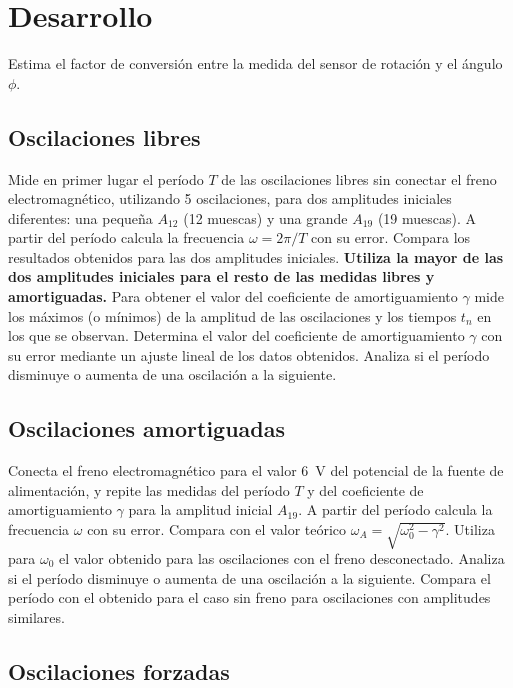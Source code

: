 \documentclass[11pt]{articulo}
\begin{document}
\section{Desarrollo}

Estima el factor de conversi\'on entre la medida del sensor de rotaci\'on y el \'angulo $\phi$.

\subsection{Oscilaciones libres}

Mide en primer lugar el per\'iodo $T$ de las oscilaciones libres sin conectar el freno electromagn\'etico, utilizando 5 oscilaciones, para dos amplitudes iniciales diferentes: una peque\~na $A_{12}$ (12 muescas) y una grande $A_{19}$ (19 muescas). A partir del per\'iodo calcula la frecuencia $\omega = 2\pi/T$ con su error. Compara los resultados obtenidos para las dos amplitudes iniciales. {\bf Utiliza la mayor de las dos amplitudes iniciales para el resto de las medidas libres y amortiguadas.} Para obtener el valor del coeficiente de amortiguamiento $\gamma$ mide los m\'aximos (o m\'inimos) de la amplitud de las oscilaciones y los tiempos $t_n$ en los que se observan. Determina el valor del coeficiente de amortiguamiento $\gamma$ con su error mediante un ajuste lineal de los datos obtenidos. Analiza si el per\'iodo disminuye o aumenta de una oscilaci\'on a la siguiente.

\subsection{Oscilaciones amortiguadas}

Conecta el freno electromagn\'etico para el valor 6~V del potencial de la fuente de alimentaci\'on, y repite las medidas del per\'iodo $T$ y del coeficiente de amortiguamiento $\gamma$ para la amplitud inicial $A_{19}$. A partir del per\'iodo calcula la frecuencia $\omega$ con su error. Compara con el valor te\'orico $\omega_A = \sqrt{\omega_0^2 - \gamma^2}$. Utiliza para $\omega_0$ el valor obtenido para las oscilaciones con el freno desconectado. Analiza si el per\'iodo disminuye o aumenta de una oscilaci\'on a la siguiente. Compara el per\'iodo con el obtenido para el caso sin freno para oscilaciones con amplitudes similares.

\subsection{Oscilaciones forzadas}
\end{document}
